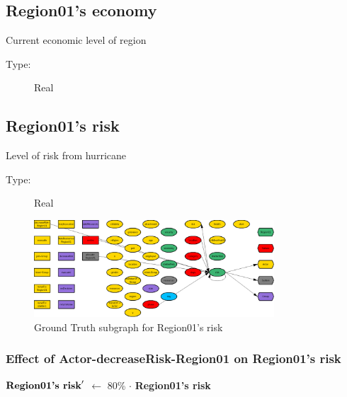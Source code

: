 \documentclass{article}%
\begin{document}
%
\subsection{Region01's economy}%
\label{subsec:Region01's economy}%
Current economic level of region%
\begin{description}%
\item[Type:]%
Real%
\end{description}

%
\subsection{Region01's risk}%
\label{subsec:Region01's risk}%
Level of risk from hurricane%
\begin{description}%
\item[Type:]%
Real%
\end{description}%


\begin{figure}[ht]%
\centering%
\includegraphics[width=0.8\textwidth]{images/riskOfRegion01.png}%
\caption{Ground Truth subgraph for Region01's risk}%
\end{figure}

%
\subsubsection{Effect of Actor{-}decreaseRisk{-}Region01 on Region01's risk}%
\label{ssubsec:Effect of Actor{-}decreaseRisk{-}Region01 on Region01's risk}%
\begin{flushleft}%
$\mbox{\textbf{Region01's risk}} '$%
$\leftarrow$%
80\%%
$\cdot$%
\textbf{Region01's risk}%
\end{flushleft}

%
\end{document}

